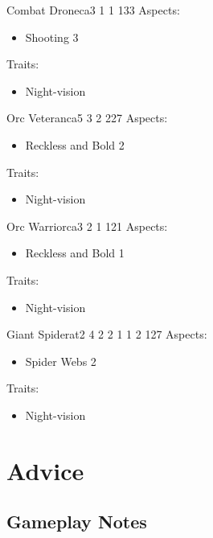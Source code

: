 \documentclass[11pt]{article}
\begin{document}
{\begin{npc}{Combat Drone}{ca}{3 1 1 1}{33}
Aspects:
\begin{itemize}
\item Shooting 3
\end{itemize}
Traits:
\begin{itemize}
\item Night-vision
\end{itemize}
\end{npc}

\begin{npc}{Orc Veteran}{ca}{5 3 2 2}{27}
Aspects:
\begin{itemize}
\item Reckless and Bold 2
\end{itemize}
Traits:
\begin{itemize}
\item Night-vision
\end{itemize}
\end{npc}

\begin{npc}{Orc Warrior}{ca}{3 2 1 1}{21}
Aspects:
\begin{itemize}
\item Reckless and Bold 1
\end{itemize}
Traits:
\begin{itemize}
\item Night-vision
\end{itemize}
\end{npc}

\begin{npc}{Giant Spider}{at}{2 4 2 2 1 1 2 1}{27}
Aspects:
\begin{itemize}
\item Spider Webs 2
\end{itemize}
Traits:
\begin{itemize}
\item Night-vision
\end{itemize}
\end{npc}


\newpage

\section{Advice}
\label{sec:orgf41f4c6}
\subsection{Gameplay Notes}
\label{sec:org9e5cfec}

}
\end{document}
